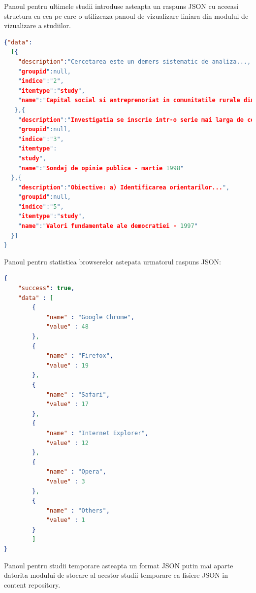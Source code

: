 Panoul pentru ultimele studii introduse asteapta un raspuns JSON cu aceeasi structura ca cea pe care o utilizeaza panoul de vizualizare liniara din modulul de vizualizare a studiilor. 


\begin{lstlisting}[language=json,firstnumber=1]
{"data":
  [{
    "description":"Cercetarea este un demers sistematic de analiza..., 
    "groupid":null,
    "indice":"2",
    "itemtype":"study",
    "name":"Capital social si antreprenoriat in comunitatile rurale din Romania. Sate muntenesti - 1999"
   },{
    "description":"Investigatia se inscrie intr-o serie mai larga de cercetari menite sa ....",
    "groupid":null,
    "indice":"3",
    "itemtype":
    "study",
    "name":"Sondaj de opinie publica - martie 1998"
  },{
    "description":"Obiective: a) Identificarea orientarilor...",
    "groupid":null,
    "indice":"5",
    "itemtype":"study",
    "name":"Valori fundamentale ale democratiei - 1997"
  }]
}
\end{lstlisting}  
  
Panoul pentru statistica browserelor astepata urmatorul raspuns JSON:


\begin{lstlisting}[language=json,firstnumber=1]
{ 
    "success": true,
    "data" : [
        {
            "name" : "Google Chrome",
            "value" : 48
        },
        {
            "name" : "Firefox",
            "value" : 19
        },
        {
            "name" : "Safari",
            "value" : 17
        },
        {
            "name" : "Internet Explorer",
            "value" : 12
        },
        {
            "name" : "Opera",
            "value" : 3
        },
        {
            "name" : "Others",
            "value" : 1
        }
        ]
}
\end{lstlisting}  
  
Panoul pentru studii temporare asteapta un format JSON putin mai aparte datorita modului de stocare al acestor studii temporare ca fisiere JSON in content repository. 

